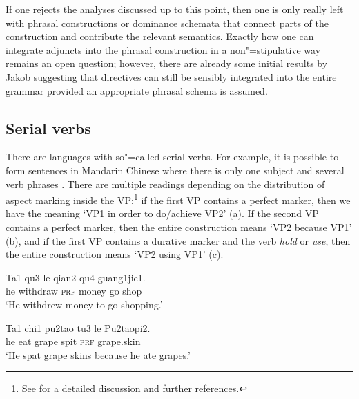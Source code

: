 \begin{exe}
\begin{xlist}[iv.]
\begin{exe}
\begin{xlist}[iv.]
\largerpage[2]
If one rejects the analyses discussed up to this point, then one is only really left with phrasal constructions or dominance schemata that connect parts
of the construction and contribute the relevant semantics. Exactly how one can integrate adjuncts into the phrasal construction in a non"=stipulative way
remains an open question; however, there are already some initial results by Jakob \citet{Mache2010a} suggesting that directives can still be sensibly integrated into
the entire grammar provided an appropriate phrasal schema is assumed.

\subsection{Serial verbs}

There are languages with so"=called serial verbs. For
example, it is possible to form sentences in Mandarin Chinese where there is only one subject 
and several verb phrases \citep[Chapter~21]{LT81a}. There are multiple readings depending on the
distribution of aspect marking inside the VP:\footnote{%
  See  for a detailed discussion and further references.
} if the first VP contains a perfect marker, then we have
the meaning `VP1 in order to do/achieve VP2' (a). If the second VP contains a perfect marker, then the entire construction means `VP2 because VP1' (b), and if the
first VP contains a durative marker and the verb \emph{hold} or \emph{use}, then the entire
construction means `VP2 using VP1' (c). 

\eal
\ex
\gll Ta1 qu3 le qian2 qu4 guang1jie1. \\
     he withdraw \textsc{prf} money go shop \\
\glt `He withdrew money to go shopping.'


\ex
\gll Ta1 chi1 pu2tao tu3 le Pu2taopi2.\\
      he eat grape spit \textsc{prf} grape.skin\\
\glt `He spat grape skins because he ate grapes.'


\end{xlist}
\end{exe}
\end{xlist}
\end{exe}
